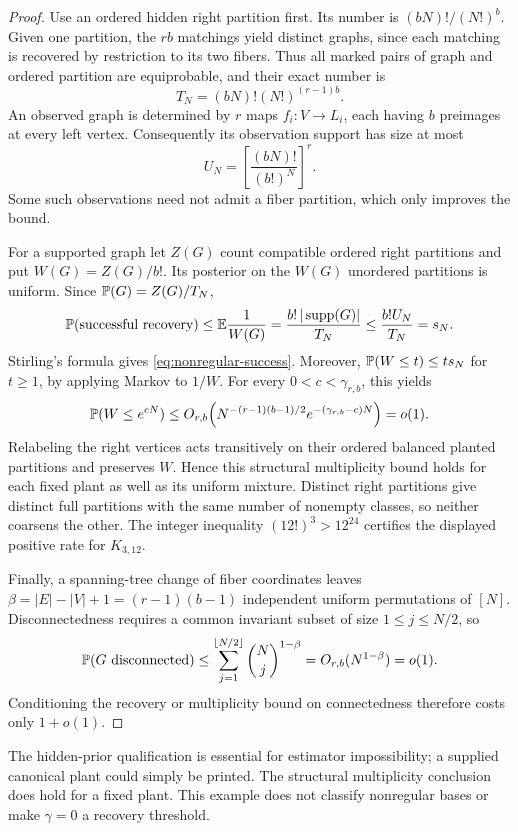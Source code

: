 \begin{proof}
Use an ordered hidden right partition first. Its number is
$(bN)!/(N!)^b$. Given one partition, the $rb$ matchings yield distinct
graphs, since each matching is recovered by restriction to its two
fibers. Thus all marked pairs of graph and ordered partition are
equiprobable, and their exact number is
\[
 T_N=(bN)!(N!)^{(r-1)b}.
\]
An observed graph is determined by $r$ maps $f_i:V\to L_i$, each
having $b$ preimages at every left vertex. Consequently its observation
support has size at most
\[
 U_N=\left[\frac{(bN)!}{(b!)^N}\right]^r.
\]
Some such observations need not admit a fiber partition, which only
improves the bound.

For a supported graph let $Z(G)$ count compatible ordered right
partitions and put $W(G)=Z(G)/b!$. Its posterior on the $W(G)$
unordered partitions is uniform. Since $\mathbb P(G)=Z(G)/T_N$,
\[
 \mathbb P(\text{successful recovery})
 \le\mathbb E\frac1{W(G)}
 =\frac{b!\,|\operatorname{supp}(G)|}{T_N}
 \le\frac{b!U_N}{T_N}=s_N.
\]
Stirling's formula gives \eqref{eq:nonregular-success}. Moreover,
$\mathbb P(W\le t)\le t s_N$ for $t\ge1$, by applying Markov to $1/W$.
For every $0<c<\gamma_{r,b}$, this yields
\[
 \mathbb P(W\le e^{cN})
 \le O_{r,b}\!\left(N^{-(r-1)(b-1)/2}
                         e^{-(\gamma_{r,b}-c)N}\right)=o(1).
\]
Relabeling the right vertices acts transitively on their ordered
balanced planted partitions and preserves $W$. Hence this structural
multiplicity bound holds for each fixed plant as well as its uniform
mixture. Distinct right partitions give distinct full partitions with
the same number of nonempty classes, so neither coarsens the other.
The integer inequality $(12!)^3>12^{24}$ certifies the displayed
positive rate for $K_{3,12}$.

Finally, a spanning-tree change of fiber coordinates leaves
$\beta=|E|-|V|+1=(r-1)(b-1)$ independent uniform permutations of
$[N]$. Disconnectedness requires a common invariant subset of size
$1\le j\le N/2$, so
\[
 \mathbb P(G\text{ disconnected})
 \le\sum_{j=1}^{\lfloor N/2\rfloor}\binom Nj^{1-\beta}
 =O_{r,b}(N^{1-\beta})=o(1).
\]
Conditioning the recovery or multiplicity bound on connectedness
therefore costs only $1+o(1)$.
\end{proof}

The hidden-prior qualification is essential for estimator impossibility;
a supplied canonical plant could simply be printed. The structural
multiplicity conclusion does hold for a fixed plant. This example does
not classify nonregular bases or make $\gamma=0$ a recovery threshold.

